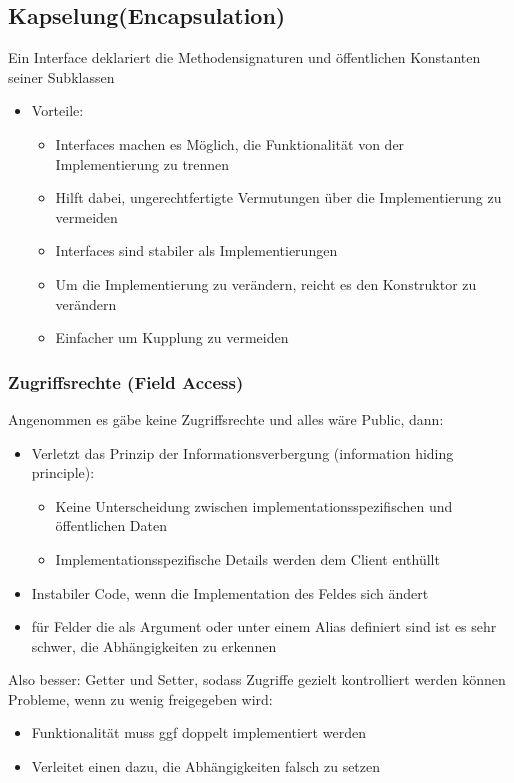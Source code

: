 \documentclass[
    ngerman,
    color=3b,
    summary,
    boxarc,
    main,
]{rubos-tuda-template}
\begin{document}
\subsection{Kapselung(Encapsulation)}
\begin{definition}
    Ein Interface deklariert die Methodensignaturen und öffentlichen Konstanten seiner Subklassen
\end{definition}
\begin{itemize}
    \item Vorteile:\begin{itemize}
              \item Interfaces machen es Möglich, die Funktionalität von der Implementierung zu trennen
              \item Hilft dabei, ungerechtfertigte Vermutungen über die Implementierung zu vermeiden
              \item Interfaces sind stabiler als Implementierungen
              \item Um die Implementierung zu verändern, reicht es den Konstruktor zu verändern
              \item Einfacher um Kupplung zu vermeiden
          \end{itemize}
\end{itemize}
\clearpage
\subsubsection{Zugriffsrechte (Field Access)}
Angenommen es gäbe keine Zugriffsrechte und alles wäre Public, dann:
\begin{itemize}
    \item Verletzt das Prinzip der Informationsverbergung (information hiding principle):\begin{itemize}
              \item Keine Unterscheidung zwischen implementationsspezifischen und öffentlichen Daten
              \item Implementationsspezifische Details werden dem Client enthüllt
          \end{itemize}
    \item Instabiler Code, wenn die Implementation des Feldes sich ändert
    \item für Felder die als Argument oder unter einem Alias definiert sind ist es sehr schwer, die Abhängigkeiten zu erkennen
\end{itemize}
Also besser: Getter und Setter, sodass Zugriffe gezielt kontrolliert werden können
Probleme, wenn zu wenig freigegeben wird:\begin{itemize}
    \item Funktionalität muss ggf doppelt implementiert werden
    \item Verleitet einen dazu, die Abhängigkeiten falsch zu setzen
\end{itemize}
\end{document}
